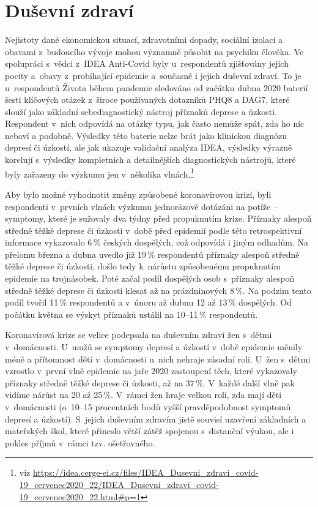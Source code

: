 \section*{Duševní zdraví}
\label{Dusevni_zdravi}

Nejistoty dané ekonomickou situací, zdravotními dopady, sociální izolací a obavami z budoucího vývoje mohou významně působit na psychiku člověka. Ve spolupráci s vědci z~IDEA Anti-Covid byly u~respondentů zjišťovány jejich pocity a obavy z probíhající epidemie a současně i jejich duševní zdraví. To je u~respondentů Života během pandemie sledováno od začátku dubna 2020 baterií šesti klíčových otázek z široce používaných dotazníků PHQ8 a DAG7, které slouží jako základní sebediagnostický nástroj příznaků deprese a úzkosti. Respondent v nich odpovídá na otázky typu, jak často nemůže spát, zda ho nic nebaví a podobně. Výsledky této baterie nelze brát jako klinickou diagnózu depresí či úzkostí, ale jak ukazuje validační analýza IDEA, výsledky výrazně korelují s výsledky kompletních a detailnějších diagnostických nástrojů, které byly zařazeny do výzkumu jen v několika vlnách.\footnote{viz
\url{https://idea.cerge-ei.cz/files/IDEA\_Dusevni\_zdravi\_covid-19\_cervenec2020\_22/IDEA\_Dusevni\_zdravi\_covid-19\_cervenec2020\_22.html\#p=1}}

Aby bylo možné vyhodnotit změny způsobené koronavirovou krizí, byli respondenti v prvních vlnách výzkumu jednorázově dotázáni na potíže – symptomy, které je sužovaly dva týdny před propuknutím krize. Příznaky alespoň středně těžké deprese či úzkosti v~době před epidemií podle této retrospektivní informace vykazovalo 6\,\% českých dospělých, což odpovídá i jiným odhadům. Na přelomu března a dubna uvedlo již 19\,\% respondentů příznaky alespoň středně těžké deprese či úzkosti, došlo tedy k~nárůstu způsobenému propuknutím epidemie na trojnásobek. Poté začal podíl dospělých osob s příznaky alespoň středně těžké deprese či úzkosti klesat až na prázdninových 8\,\%. Na podzim tento podíl tvořil 11\,\% respondentů a v únoru až dubnu 12 až 13\,\% dospělých. Od počátku května se výskyt příznaků ustálil na 10–11\,\% respondentů.

Koronavirová krize se velice podepsala na duševním zdraví žen s dětmi v~do\-mác\-nos\-ti. U~mužů se symptomy depresí a úzkostí v době epidemie měnily méně a přítomnost dětí v domácnosti u~nich nehraje zásadní roli. U~žen s dětmi vzrostlo v první vlně epidemie na jaře 2020 zastoupení těch, které vykazovaly příznaky středně těžké deprese či úzkosti, až na 37\,\%. V každé další vlně pak vidíme nárůst na 20 až 25\,\%. V rámci žen hraje velkou roli, zda mají děti v domácnosti (o~10--15 procentních bodů vyšší pravděpodobnost symptomů depresí a úzkostí). S jejich duševním zdravím jistě souvisí uzavření základních a mateřských škol, které přineslo větší zátěž spojenou s distanční výukou, ale i pokles příjmů v rámci tzv. ošetřovného.

